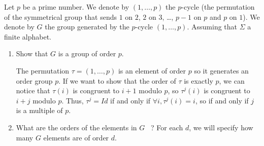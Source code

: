\documentclass[a4paper,11pt]{exam}
\newcommand{\Z}{\mathbb{Z}}
\newcommand{\N}{\mathbb{N}}
\begin{document}
\begin{questions}




\question
Let $p$ be a prime number.
We denote by $(1,\dots,p)$ the $p$-cycle (the permutation of the symmetrical group that sends $1$ on $2$, $2$ on $3$, \dots, $p-1$ on $p$ and $p$ on $1$).
We denote by $G$ the group generated by the $p$-cycle $(1,\dots,p)$. Assuming that $\Sigma$ a finite alphabet. 
\begin{enumerate}
	\item Show that $G$ is a group of order $p$.
	
	\begin{solution}
		The permutation $\tau=(1,\dots,p)$ is an element of order $p$ so it generates an order group $p$.
		If we want to show that the order of $\tau$ is exactly $p$, we can notice that $\tau(i)$ is congruent to $i+1$ modulo $p$, so $\tau^j(i)$ is congruent to $i+j$ modulo $p$. Thus, $\tau^j=Id$ if and only if $\forall i, \tau^j(i)=i$, so if and only if $j$ is a multiple of $p$.
	\end{solution}
	
	\item What are the orders of the elements in $G$~ ? 
	For each $d$, we will specify how many $G$ elements are of order $d$.
	

\end{enumerate}
\end{questions}
\end{document}
